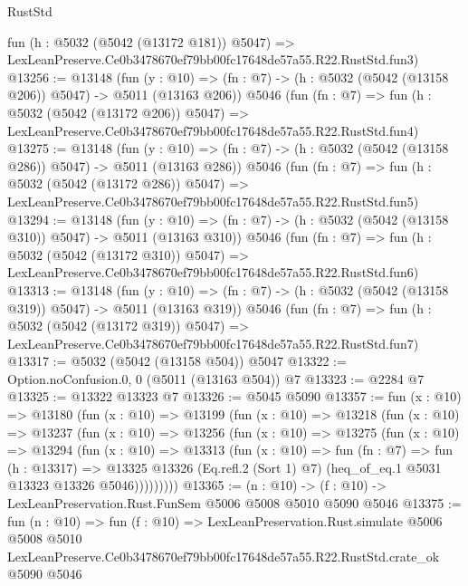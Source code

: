 \begin{lexlean}{RustStd}
\begin{coremodule}
    fun (h : @5032 (@5042 (@13172 @181)) @5047) =>
    LexLeanPreserve.Ce0b3478670ef79bb00fc17648de57a55.R22.RustStd.fun3)
@13256 := @13148
    (fun (y : @10) => (fn : @7) -> (h : @5032 (@5042 (@13158 @206)) @5047) -> @5011 (@13163 @206))
    @5046
    (fun (fn : @7) =>
    fun (h : @5032 (@5042 (@13172 @206)) @5047) =>
    LexLeanPreserve.Ce0b3478670ef79bb00fc17648de57a55.R22.RustStd.fun4)
@13275 := @13148
    (fun (y : @10) => (fn : @7) -> (h : @5032 (@5042 (@13158 @286)) @5047) -> @5011 (@13163 @286))
    @5046
    (fun (fn : @7) =>
    fun (h : @5032 (@5042 (@13172 @286)) @5047) =>
    LexLeanPreserve.Ce0b3478670ef79bb00fc17648de57a55.R22.RustStd.fun5)
@13294 := @13148
    (fun (y : @10) => (fn : @7) -> (h : @5032 (@5042 (@13158 @310)) @5047) -> @5011 (@13163 @310))
    @5046
    (fun (fn : @7) =>
    fun (h : @5032 (@5042 (@13172 @310)) @5047) =>
    LexLeanPreserve.Ce0b3478670ef79bb00fc17648de57a55.R22.RustStd.fun6)
@13313 := @13148
    (fun (y : @10) => (fn : @7) -> (h : @5032 (@5042 (@13158 @319)) @5047) -> @5011 (@13163 @319))
    @5046
    (fun (fn : @7) =>
    fun (h : @5032 (@5042 (@13172 @319)) @5047) =>
    LexLeanPreserve.Ce0b3478670ef79bb00fc17648de57a55.R22.RustStd.fun7)
@13317 := @5032 (@5042 (@13158 @504)) @5047
@13322 := Option.noConfusion.{0, 0} (@5011 (@13163 @504)) @7
@13323 := @2284 @7
@13325 := @13322 @13323 @7
@13326 := @5045 @5090
@13357 := fun (x : @10) =>
  @13180
    (fun (x : @10) =>
    @13199
      (fun (x : @10) =>
      @13218
        (fun (x : @10) =>
        @13237
          (fun (x : @10) =>
          @13256
            (fun (x : @10) =>
            @13275
              (fun (x : @10) =>
              @13294
                (fun (x : @10) =>
                @13313
                  (fun (x : @10) =>
                  fun (fn : @7) =>
                  fun (h : @13317) =>
                  @13325
                    @13326
                    (Eq.refl.{2} (Sort 1) @7)
                    (heq_of_eq.{1} @5031 @13323 @13326 @5046)))))))))
@13365 := (n : @10) -> (f : @10) -> LexLeanPreservation.Rust.FunSem @5006 @5008 @5010 @5090 @5046
@13375 := fun (n : @10) =>
  fun (f : @10) =>
  LexLeanPreservation.Rust.simulate
    @5006
    @5008
    @5010
    LexLeanPreserve.Ce0b3478670ef79bb00fc17648de57a55.R22.RustStd.crate_ok
    @5090
    @5046
\end{coremodule}
\end{lexlean}
